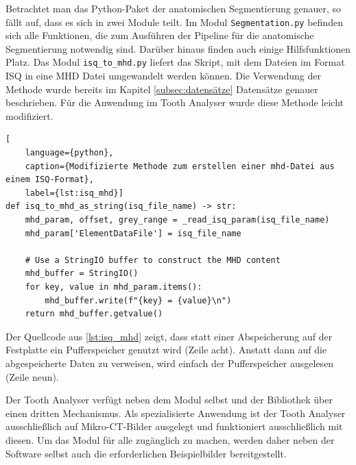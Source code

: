 Betrachtet man das Python-Paket der anatomischen Segmentierung genauer, so fällt
auf, dass es sich in zwei Module teilt. Im Modul \texttt{Segmentation.py} befinden
sich alle Funktionen, die zum Ausführen der Pipeline für die anatomische
Segmentierung notwendig sind. Darüber hinaus finden auch einige Hilfsfunktionen Platz.
Das Modul \texttt{isq\_to\_mhd.py} liefert das Skript, mit dem Dateien im Format
\ac{ISQ} in eine \ac{MHD} Datei umgewandelt werden können. Die Verwendung der Methode
wurde bereits im Kapitel \ref{subsec:datensätze} Datensätze genauer beschrieben.
Für die Anwendung im Tooth Analyser wurde diese Methode leicht modifiziert.

\begin{lstlisting}[
    language={python},
    caption={Modifizierte Methode zum erstellen einer mhd-Datei aus einem ISQ-Format},
    label={lst:isq_mhd}]
def isq_to_mhd_as_string(isq_file_name) -> str:
    mhd_param, offset, grey_range = _read_isq_param(isq_file_name)
    mhd_param['ElementDataFile'] = isq_file_name

    # Use a StringIO buffer to construct the MHD content
    mhd_buffer = StringIO()
    for key, value in mhd_param.items():
        mhd_buffer.write(f"{key} = {value}\n")
    return mhd_buffer.getvalue()
\end{lstlisting}

Der Quellcode aus \ref{lst:isq_mhd} zeigt, dass statt einer Abspeicherung auf
der Festplatte ein Pufferspeicher genutzt wird (Zeile acht). Anstatt dann auf die
abgespeicherte Daten zu verweisen, wird einfach der Pufferspeicher ausgelesen (Zeile
neun).

Der Tooth Analyser verfügt neben dem Modul selbst und der Bibliothek über einen
dritten Mechanismus. Als spezialisierte Anwendung ist der Tooth Analyser ausschließlich
auf Mikro-CT-Bilder ausgelegt und funktioniert ausschließlich mit diesen. Um das
Modul für alle zugänglich zu machen, werden daher neben der Software selbst auch
die erforderlichen Beispielbilder bereitgestellt.

